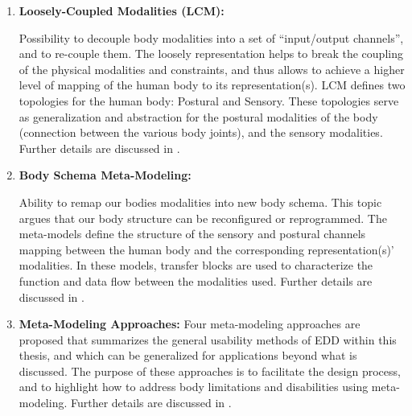 \begin{enumerate}[label=T\arabic*.]
 \setlength\itemsep{0em}

\item \textbf{Loosely-Coupled Modalities (LCM):}

Possibility to decouple body modalities into a set of ``input/output channels'', and to re-couple them. The loosely representation helps to break the coupling of the physical modalities and constraints, and thus allows to achieve a higher level of mapping of the human body to its representation(s). LCM defines two topologies for the human body: Postural and Sensory. These topologies serve as generalization and abstraction for the postural modalities of the body (connection between the various body joints), and the sensory modalities. Further details are discussed in .

\item \textbf{Body Schema Meta-Modeling:}

Ability to remap our bodies modalities into new body schema. This topic argues that our body structure can be reconfigured or reprogrammed. The meta-models define the structure of the sensory and postural channels mapping between the human body and the corresponding representation(s)' modalities. In these models, transfer blocks are used to characterize the function and data flow between the modalities used. Further details are discussed in .

\item \textbf{Meta-Modeling Approaches:}
Four meta-modeling approaches are proposed that summarizes the general usability methods of EDD within this thesis, and which can be generalized for applications beyond what is discussed. The purpose of these approaches is to facilitate the design process, and to highlight how to address body limitations and disabilities using meta-modeling. Further details are discussed in .

\end{enumerate}



